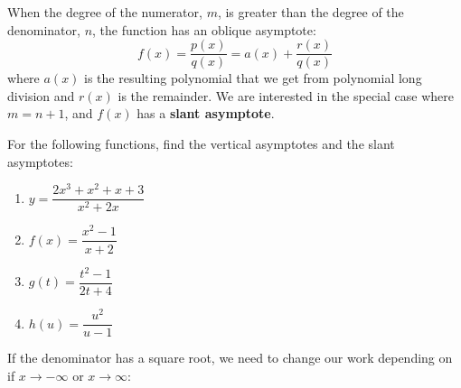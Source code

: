 \documentclass[mathNotesPreamble]{subfiles}
\begin{document}
      \begin{defn*}
      When the degree of the numerator, $m$, is greater than the degree of the denominator, $n$, the function has an oblique asymptote:
        $$f(x)=\dfrac{p(x)}{q(x)}=a(x)+\dfrac{r(x)}{q(x)}$$
      where $a(x)$ is the resulting polynomial that we get from polynomial long division and $r(x)$ is the remainder. We are interested in the special case where $m=n+1$, and $f(x)$ has a \textbf{slant asymptote}.
      \end{defn*}
      \begin{ex*}
        For the following functions, find the vertical asymptotes and the slant asymptotes:
      \end{ex*}
      \begin{enumerate}[itemsep=\stretch{1}]
        \item $y=\dfrac{2x^3+x^2+x+3}{x^2+2x}$
        \item $f(x)=\dfrac{x^2-1}{x+2}$
      \end{enumerate}
      \pagebreak
      \begin{enumerate}[itemsep=\stretch{1}]
        \setcounter{enumi}{2}
        \item $g(t)=\dfrac{t^2-1}{2t+4}$
        \item $h(u)=\dfrac{u^2}{u-1}$
      \end{enumerate}
      \pagebreak
      If the denominator has a square root, we need to change our work depending on if $x\to-\infty$ or $x\to\infty$:\\
      
\end{document}
